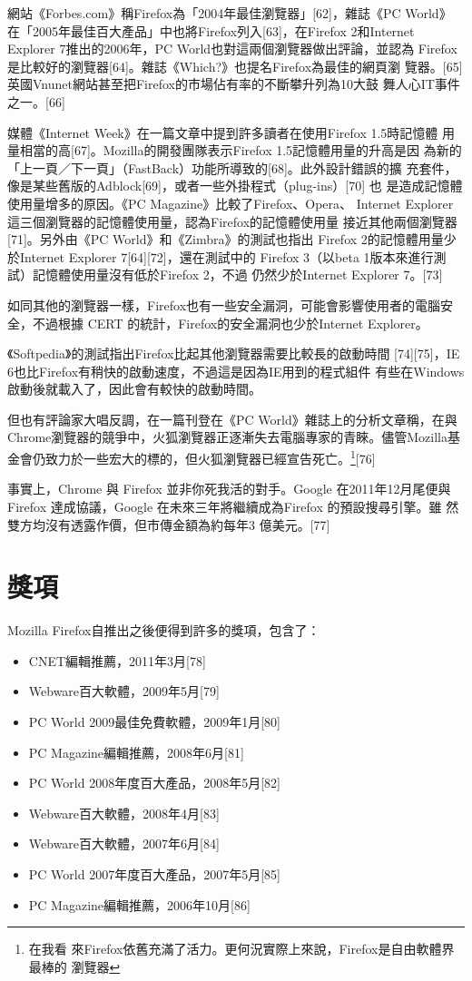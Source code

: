 \documentclass[12pt, a4paper, twoside]{article}
\begin{document}
網站《Forbes.com》稱Firefox為「2004年最佳瀏覽器」[62]，雜誌《PC World》
在「2005年最佳百大產品」中也將Firefox列入[63]，在Firefox 2和Internet
Explorer 7推出的2006年，PC World也對這兩個瀏覽器做出評論，並認為
Firefox是比較好的瀏覽器[64]。雜誌《Which?》也提名Firefox為最佳的網頁瀏
覽器。[65] 英國Vnunet網站甚至把Firefox的市場佔有率的不斷攀升列為10大鼓
舞人心IT事件之一。[66]

媒體《Internet Week》在一篇文章中提到許多讀者在使用Firefox 1.5時記憶體
用量相當的高[67]。Mozilla的開發團隊表示Firefox 1.5記憶體用量的升高是因
為新的「上一頁／下一頁」（FastBack）功能所導致的[68]。此外設計錯誤的擴
充套件，像是某些舊版的Adblock[69]，或者一些外掛程式（plug-ins）[70] 也
是造成記憶體使用量增多的原因。《PC Magazine》比較了Firefox、Opera、
Internet Explorer這三個瀏覽器的記憶體使用量，認為Firefox的記憶體使用量
接近其他兩個瀏覽器[71]。另外由《PC World》和《Zimbra》的測試也指出
Firefox 2的記憶體用量少於Internet Explorer 7[64][72]，還在測試中的
Firefox 3（以beta 1版本來進行測試）記憶體使用量沒有低於Firefox 2，不過
仍然少於Internet Explorer 7。[73]

如同其他的瀏覽器一樣，Firefox也有一些安全漏洞，可能會影響使用者的電腦安
全，不過根據 CERT 的統計，Firefox的安全漏洞也少於Internet Explorer。

《Softpedia》的測試指出Firefox比起其他瀏覽器需要比較長的啟動時間
[74][75]，IE 6也比Firefox有稍快的啟動速度，不過這是因為IE用到的程式組件
有些在Windows啟動後就載入了，因此會有較快的啟動時間。

但也有評論家大唱反調，在一篇刊登在《PC World》雜誌上的分析文章稱，在與
Chrome瀏覽器的競爭中，火狐瀏覽器正逐漸失去電腦專家的青睞。儘管Mozilla基
金會仍致力於一些宏大的標的，但火狐瀏覽器已經宣告死亡。\footnote{在我看
  來Firefox依舊充滿了活力。更何況實際上來說，Firefox是自由軟體界最棒的
  瀏覽器}[76]

事實上，Chrome 與 Firefox 並非你死我活的對手。Google 在2011年12月尾便與
Firefox 達成協議，Google 在未來三年將繼續成為Firefox 的預設搜尋引擎。雖
然雙方均沒有透露作價，但市傳金額為約每年3 億美元。[77]

\section{獎項}

Mozilla Firefox自推出之後便得到許多的獎項，包含了：

\begin{itemize}
\item CNET編輯推薦，2011年3月[78]
\item Webware百大軟體，2009年5月[79]
\item PC World 2009最佳免費軟體，2009年1月[80]
\item PC Magazine編輯推薦，2008年6月[81]
\item PC World 2008年度百大產品，2008年5月[82]
\item Webware百大軟體，2008年4月[83]
\item Webware百大軟體，2007年6月[84]
\item PC World 2007年度百大產品，2007年5月[85]
\item PC Magazine編輯推薦，2006年10月[86]
\end{itemize}
\end{document}

